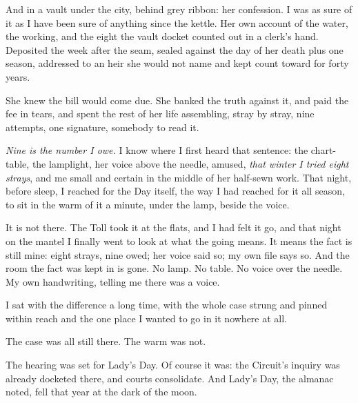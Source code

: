 And in a vault under the city, behind grey ribbon: her confession. I was as sure of it as I have been sure of anything since the kettle. Her own account of the water, the working, and the eight the vault docket counted out in a clerk's hand. Deposited the week after the seam, sealed against the day of her death plus one season, addressed to an heir she would not name and kept count toward for forty years.

She knew the bill would come due. She banked the truth against it, and paid the fee in tears, and spent the rest of her life assembling, stray by stray, nine attempts, one signature, somebody to read it.

\emph{Nine is the number I owe.} I know where I first heard that sentence: the chart-table, the lamplight, her voice above the needle, amused, \emph{that winter I tried eight strays}, and me small and certain in the middle of her half-sewn work. That night, before sleep, I reached for the Day itself, the way I had reached for it all season, to sit in the warm of it a minute, under the lamp, beside the voice.

It is not there. The Toll took it at the flats, and I had felt it go, and that night on the mantel I finally went to look at what the going means. It means the fact is still mine: eight strays, nine owed; her voice said so; my own file says so. And the room the fact was kept in is gone. No lamp. No table. No voice over the needle. My own handwriting, telling me there was a voice.

I sat with the difference a long time, with the whole case strung and pinned within reach and the one place I wanted to go in it nowhere at all.

The case was all still there. The warm was not.

The hearing was set for Lady's Day. Of course it was: the Circuit's inquiry was already docketed there, and courts consolidate. And Lady's Day, the almanac noted, fell that year at the dark of the moon.
